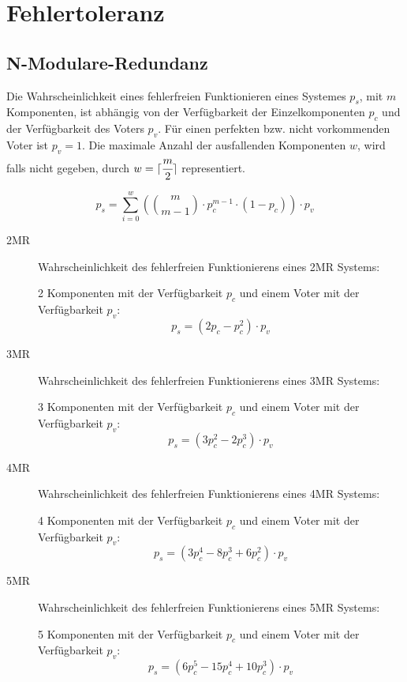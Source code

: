 \section{Fehlertoleranz}

\subsection{N-Modulare-Redundanz}
Die Wahrscheinlichkeit eines fehlerfreien Funktionieren eines Systemes $p_{s}$, mit $m$ 
Komponenten, ist abhängig von der Verfügbarkeit der Einzelkomponenten $p_{c}$ und der
Verfügbarkeit des Voters $p_{v}$. Für einen perfekten bzw. nicht vorkommenden Voter
ist $p_{v} = 1$. Die maximale Anzahl der ausfallenden Komponenten $w$, wird falls nicht
gegeben, durch $w = \lceil \cfrac{m}{2} \rceil$ representiert.

\[
    p_{s} = \sum_{i = 0}^{w} \left( \binom{m}{m - 1} \cdot p_{c}^{m - 1} \cdot (1 - p_{c}) \right) \cdot p_{v}
\]

\begin{description}
 \item[2MR]
 Wahrscheinlichkeit des fehlerfreien Funktionierens eines 2MR Systems:\par 
 2 Komponenten mit der Verfügbarkeit $p_{c}$ und einem Voter mit der Verfügbarkeit $p_{v}$:
 \[
    p_{s} = \left(2 p_{c} - p_{c}^{2} \right) \cdot p_{v}
 \]
 \item[3MR]
 Wahrscheinlichkeit des fehlerfreien Funktionierens eines 3MR Systems:\par 
 3 Komponenten mit der Verfügbarkeit $p_{c}$ und einem Voter mit der Verfügbarkeit $p_{v}$:
 \[
    p_{s} = \left(3 p_{c}^{2} - 2 p_{c}^{3} \right) \cdot p_{v}
 \]
 \item[4MR]
 Wahrscheinlichkeit des fehlerfreien Funktionierens eines 4MR Systems:\par 
 4 Komponenten mit der Verfügbarkeit $p_{c}$ und einem Voter mit der Verfügbarkeit $p_{v}$:
 \[
    p_{s} = \left(3 p_{c}^{4} - 8 p_{c}^{3} + 6 p_{c}^{2} \right) \cdot p_{v}
 \]
 \item[5MR]
 Wahrscheinlichkeit des fehlerfreien Funktionierens eines 5MR Systems:\par 
 5 Komponenten mit der Verfügbarkeit $p_{c}$ und einem Voter mit der Verfügbarkeit $p_{v}$:
 \[
    p_{s} = \left(6 p_{c}^{5} - 15 p_{c}^{4} + 10 p_{c}^{3} \right) \cdot p_{v}
 \]
\end{description}
